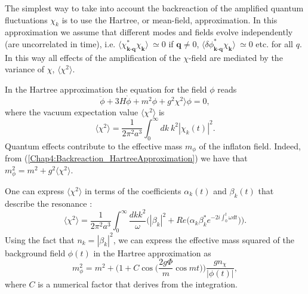 \documentclass[11pt,a4paper,twoside]{book}
\begin{document}
The simplest way to take into account the backreaction of the amplified quantum fluctuations $ \chi_{k} $ is to use the Hartree, or mean-field, approximation. In this approximation we assume that different modes and fields evolve independently (are uncorrelated in time), i.e.
 $ \langle \chi^{*}_\textbf{k-q}\chi_{\textbf{k}}\rangle \ \simeq 0 $ if $\textbf{q}\neq 0$, $\langle \delta \phi^{*}_\textbf{k-q}\chi_{\textbf{k}}\rangle \ \simeq 0 $ etc. for all $ q $.  In this way all effects of the amplification of the $\chi$-field are mediated by the variance of $\chi$, $ \langle \chi^{2}\rangle  $. 
 
In the Hartree approximation the equation for the field $\phi$ reads
\begin{equation}
\label{Chap4:Backreaction_HartreeApproximation}
\ddot{\phi} + 3H\dot{\phi} + m^{2}\phi + g^{2}\chi^{2}\rangle  \phi=0,
\end{equation}
where the vacuum expectation value $ \langle \chi^{2}\rangle   $ is
 \begin{equation}
\label{Chap4:Backreaction_vevChi2}
\langle \chi^{2}\rangle  =\frac{1}{2\pi^{2}a^{3}}\int_{0}^{\infty} dk\  k^{2}|\chi_{k}(t)|^{2}.
\end{equation}
Quantum effects contribute to the effective mass $ m_{\phi} $ of the inflaton field. Indeed, from (\ref{Chap4:Backreaction_HartreeApproximation}) we have that $ m_{\phi}^{2}=m^{2} + g^{2}\langle \chi^{2}\rangle   $. 

One can express $ \langle \chi^{2}\rangle   $ in terms of the coefficients $ \alpha_{k}(t) $ and $\beta_{k}(t)$ that describe the resonance \cite{Chap4:LindePreheatingModel}:
\begin{equation}
\label{Chap4:Backreaction_ExpressionFluctuation}
\langle \chi^{2}\rangle   = \frac{1}{2\pi^{2}a^{3}}\int_{0}^{\infty} \frac{dk k^{2}}{\omega} \Bigg(|\beta_{k}|^{2} + Re\Bigg(\alpha_{k}\beta_{k}^{*}e^{-2i\int_{0}^{t} \omega dt}\Bigg)\Bigg).
\end{equation}
Using the fact that $ n_{k}=|\beta_{k}|^{2} $, we can express the effective mass squared  of the background field $\phi(t)$ in the Hartree approximation as \cite{Chap4:LindePreheatingModel}
\begin{equation}
\label{Chap4:Backreaction_EffectiveMass}
m^{2}_{\phi}=m^{2} + \Bigg(1 + C\cos\Bigg( \frac{2g\Phi}{m} \cos mt \Bigg) \Bigg) \frac{gn_{\chi}}{|\phi(t)|},
\end{equation}
where $ C $ is a numerical factor that derives from the integration. 
\end{document}
